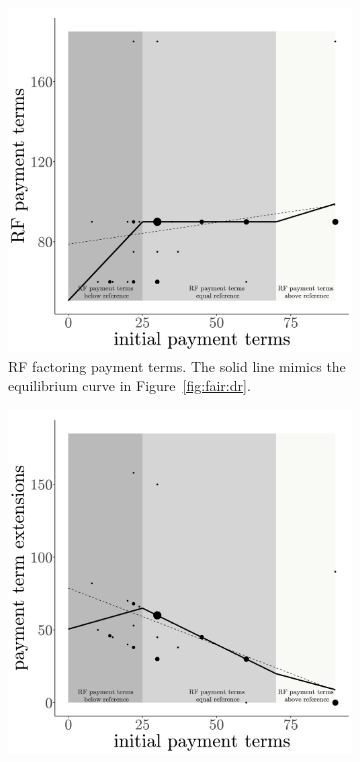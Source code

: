 \documentclass[a4paper,11pt]{article}
\renewcommand{\~}[1]{\tilde{#1}}
\renewcommand{\-}[1]{\overline{#1}}
\begin{document}
\begin{figure}[tb]
      \begin{subfigure}[b]{0.31\textwidth}
         \centering
         \includegraphics[width=\textwidth]{figures/bid_23_posterior.png}
         \caption{RF factoring payment terms. The solid line mimics the equilibrium curve in Figure~\ref{fig:fair:dr}. \vspace{18pt}}
         \label{fig:23:posterior}
     \end{subfigure}\hfill
     \begin{subfigure}[b]{0.31\textwidth}
         \centering
         \includegraphics[width=\textwidth]{figures/bid_23_extension.png}

\end{subfigure}
\end{figure}
\end{document}
